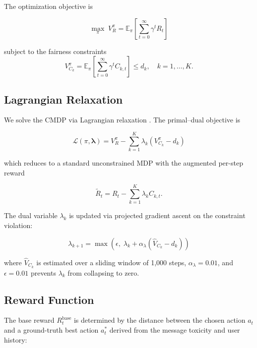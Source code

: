 \documentclass[journal]{IEEEtran}
\begin{document}
The optimization objective is

\begin{equation}\label{eq:cmdp_obj}
  \max_\pi\; V^\pi_R = \mathbb{E}_\pi\!\left[\sum_{t=0}^\infty \gamma^t R_t\right]
\end{equation}

subject to the fairness constraints
\begin{equation}\label{eq:cmdp_constraint}
  V^\pi_{C_k} = \mathbb{E}_\pi\!\left[\sum_{t=0}^\infty \gamma^t C_{k,t}\right] \leq d_k,
  \quad k = 1,\ldots,K.
\end{equation}

\subsection{Lagrangian Relaxation}

We solve the CMDP via Lagrangian relaxation \cite{altman1999,stooke2020}. The primal--dual objective is

\begin{equation}\label{eq:lagrangian}
  \mathcal{L}(\pi, \boldsymbol{\lambda}) =
    V^\pi_R - \sum_{k=1}^K \lambda_k \!\left(V^\pi_{C_k} - d_k\right)
\end{equation}

which reduces to a standard unconstrained MDP with the augmented per-step reward

\begin{equation}\label{eq:augmented_reward}
  \tilde{R}_t = R_t - \sum_{k=1}^K \lambda_k C_{k,t}.
\end{equation}

The dual variable $\lambda_k$ is updated via projected gradient ascent on the constraint
violation:

\begin{equation}\label{eq:lambda_update}
  \lambda_{k+1} = \max\!\left(\epsilon,\;
    \lambda_k + \alpha_\lambda \!\left(\hat{V}_{C_k} - d_k\right)\right)
\end{equation}

where $\hat{V}_{C_k}$ is estimated over a sliding window of 1,000 steps, $\alpha_\lambda
= 0.01$, and $\epsilon = 0.01$ prevents $\lambda_k$ from collapsing to zero.

\subsection{Reward Function}

The base reward $R^{\text{base}}_t$ is determined by the distance between the chosen
action $a_t$ and a ground-truth best action $a^*_t$ derived from the message toxicity
and user history:
\end{document}
